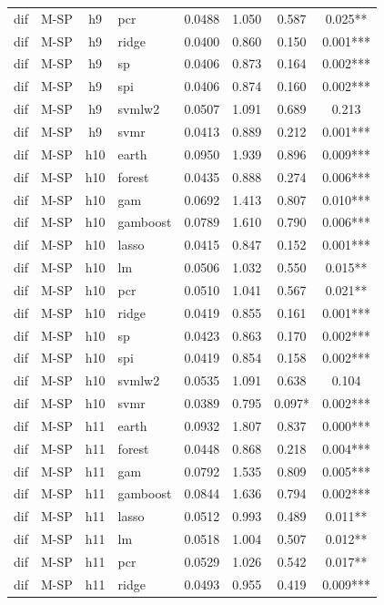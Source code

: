 \begin{ThreePartTable}
\begin{longtable}[t]{llclcccc}
dif & M-SP & h9 & pcr & 0.0488 & 1.050 & 0.587 & 0.025**\\
dif & M-SP & h9 & ridge & 0.0400 & 0.860 & 0.150 & 0.001***\\
dif & M-SP & h9 & sp & 0.0406 & 0.873 & 0.164 & 0.002***\\
dif & M-SP & h9 & spi & 0.0406 & 0.874 & 0.160 & 0.002***\\
dif & M-SP & h9 & svmlw2 & 0.0507 & 1.091 & 0.689 & 0.213\\
dif & M-SP & h9 & svmr & 0.0413 & 0.889 & 0.212 & 0.001***\\
\addlinespace
dif & M-SP & h10 & earth & 0.0950 & 1.939 & 0.896 & 0.009***\\
dif & M-SP & h10 & forest & 0.0435 & 0.888 & 0.274 & 0.006***\\
dif & M-SP & h10 & gam & 0.0692 & 1.413 & 0.807 & 0.010***\\
dif & M-SP & h10 & gamboost & 0.0789 & 1.610 & 0.790 & 0.006***\\
dif & M-SP & h10 & lasso & 0.0415 & 0.847 & 0.152 & 0.001***\\
dif & M-SP & h10 & lm & 0.0506 & 1.032 & 0.550 & 0.015**\\
dif & M-SP & h10 & pcr & 0.0510 & 1.041 & 0.567 & 0.021**\\
dif & M-SP & h10 & ridge & 0.0419 & 0.855 & 0.161 & 0.001***\\
dif & M-SP & h10 & sp & 0.0423 & 0.863 & 0.170 & 0.002***\\
dif & M-SP & h10 & spi & 0.0419 & 0.854 & 0.158 & 0.002***\\
dif & M-SP & h10 & svmlw2 & 0.0535 & 1.091 & 0.638 & 0.104\\
dif & M-SP & h10 & svmr & 0.0389 & 0.795 & 0.097* & 0.002***\\
\addlinespace
dif & M-SP & h11 & earth & 0.0932 & 1.807 & 0.837 & 0.000***\\
dif & M-SP & h11 & forest & 0.0448 & 0.868 & 0.218 & 0.004***\\
dif & M-SP & h11 & gam & 0.0792 & 1.535 & 0.809 & 0.005***\\
dif & M-SP & h11 & gamboost & 0.0844 & 1.636 & 0.794 & 0.002***\\
dif & M-SP & h11 & lasso & 0.0512 & 0.993 & 0.489 & 0.011**\\
dif & M-SP & h11 & lm & 0.0518 & 1.004 & 0.507 & 0.012**\\
dif & M-SP & h11 & pcr & 0.0529 & 1.026 & 0.542 & 0.017**\\
dif & M-SP & h11 & ridge & 0.0493 & 0.955 & 0.419 & 0.009***\\

\end{longtable}
\end{ThreePartTable}
